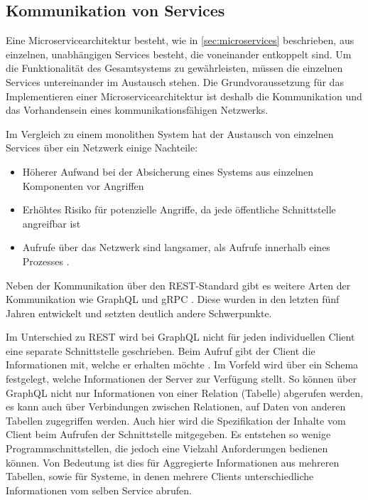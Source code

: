\subsection{Kommunikation von Services}
\label{sec:kommunikation}

Eine Microservicearchitektur besteht, wie in \cref{sec:microservices} beschrieben, aus einzelnen, unabhängigen Services besteht, die voneinander entkoppelt sind. Um die Funktionalität des Gesamtsystems zu gewährleisten, müssen die einzelnen Services untereinander im Austausch stehen. Die Grundvoraussetzung für das Implementieren einer Microservicearchitektur ist deshalb die Kommunikation und das Vorhandensein eines kommunikationsfähigen Netzwerks.

Im Vergleich zu einem monolithen System hat der Austausch von einzelnen Services über ein Netzwerk einige Nachteile:
\begin{itemize}
	\item Höherer Aufwand bei der Absicherung eines Systems aus einzelnen Komponenten vor Angriffen
	\item Erhöhtes Risiko für potenzielle Angriffe, da jede öffentliche Schnittstelle angreifbar ist
	\item Aufrufe über das Netzwerk sind langsamer, als Aufrufe innerhalb eines Prozesses \parencite[vgl.][Kap. 6.1]{wolff_microservices_2018}.
\end{itemize}

Neben der Kommunikation über den REST-Standard gibt es weitere Arten der Kommunikation wie GraphQL \parencite{graphql_docs} und gRPC \parencite{grpc_docs}. Diese wurden in den letzten fünf Jahren entwickelt und setzten deutlich andere Schwerpunkte.

Im Unterschied zu REST wird bei GraphQL nicht für jeden individuellen Client eine separate Schnittstelle geschrieben. Beim Aufruf gibt der Client die Informationen mit, welche er erhalten möchte \parencite[vgl.][]{graphql_docs}. Im Vorfeld wird über ein Schema festgelegt, welche Informationen der Server zur Verfügung stellt. So können über GraphQL nicht nur Informationen von einer Relation (Tabelle) abgerufen werden, es kann auch über Verbindungen zwischen Relationen, auf Daten von anderen Tabellen zugegriffen werden. Auch hier wird die Spezifikation der Inhalte vom Client beim Aufrufen der Schnittstelle mitgegeben. Es entstehen so wenige Programmschnittstellen, die jedoch eine Vielzahl Anforderungen bedienen können. Von Bedeutung ist dies für Aggregierte Informationen aus mehreren Tabellen, sowie für Systeme, in denen mehrere Clients unterschiedliche Informationen vom selben Service abrufen.

